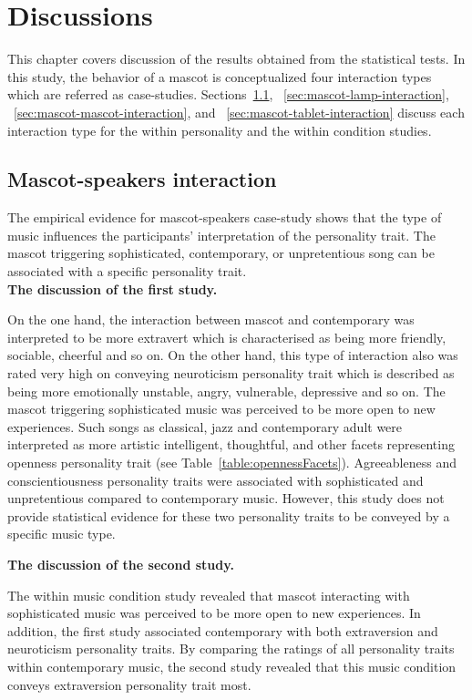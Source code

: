 \chapter{Discussions}
\label{ch:discussions}
This chapter covers discussion of the results obtained from the statistical tests.
In this study, the behavior of a mascot is conceptualized four interaction types which are referred as case-studies.
Sections~\ref{sec:mascot-speakers-interaction}, ~\ref{sec:mascot-lamp-interaction},
~\ref{sec:mascot-mascot-interaction}, and ~\ref{sec:mascot-tablet-interaction} discuss each interaction type for the
within personality and the within condition studies.

\section{Mascot-speakers interaction}
\label{sec:mascot-speakers-interaction}
The empirical evidence for mascot-speakers case-study shows that the type of music influences the participants'
interpretation of the personality trait.
The mascot triggering sophisticated, contemporary, or unpretentious song can be associated
with a specific personality trait. \\

\textbf{The discussion of the first study.}\par
On the one hand, the interaction between mascot and contemporary was interpreted
to be more extravert which is characterised as being more friendly,
sociable, cheerful and so on.
On the other hand, this type of interaction also was rated very high on conveying
neuroticism personality trait which is described as being more emotionally unstable,
angry, vulnerable, depressive and so on.
The mascot triggering sophisticated music was perceived to be more open to new experiences.
Such songs as classical, jazz and contemporary adult were interpreted as more artistic intelligent,
thoughtful, and other facets representing openness personality trait (see Table~\ref{table:opennessFacets}).
Agreeableness and conscientiousness personality traits were associated with sophisticated and
unpretentious compared to contemporary music.
However, this study does not provide statistical evidence for these two personality traits to be
conveyed by a specific music type.

\textbf{The discussion of the second study.}\par
The within music condition study revealed that mascot interacting with sophisticated music
was perceived to be more open to new experiences.
In addition, the first study associated contemporary with both extraversion and neuroticism personality traits.
By comparing the ratings of all personality traits within contemporary music, the second study revealed that this
music condition conveys extraversion personality trait most.


